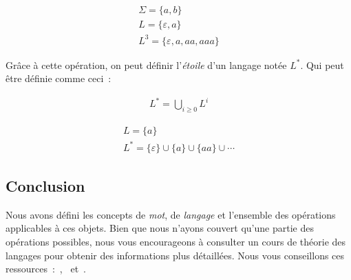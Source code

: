 \begin{example}
    \begin{gather*}
        \Sigma = \{a, b\} \\
        L = \{\varepsilon, a\} \\
        L^3 = \{\varepsilon, a, aa, aaa\}
    \end{gather*}
\end{example}

\begin{definition}
    Grâce à cette opération, on peut définir l'\textit{étoile} d'un langage
    notée \(L^*\). Qui peut être définie comme ceci~:

    \begin{gather*}
        L^* = \bigcup_{i \geq 0} L^i
    \end{gather*}
\end{definition}

\begin{example}
    \begin{gather*}
        L = \{a\} \\
        L^* = \{\varepsilon\} \cup \{a\} \cup \{aa\} \cup \cdots
    \end{gather*}
\end{example}

\subsection{Conclusion}

Nous avons défini les concepts de \textit{mot}, de \textit{langage} et
l'ensemble des opérations applicables à ces objets. Bien que nous n'ayons
couvert qu'une partie des opérations possibles, nous vous encourageons à
consulter un cours de théorie des langages pour obtenir des informations plus
détaillées. Nous vous conseillons ces
ressources~:~\cite{Harrison1978},~\cite{Autebert1994} et~\cite{Hopcroft2007}.
